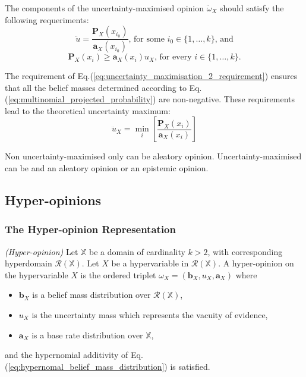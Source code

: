 The components of the uncertainty-maximised opinion $\ddot{\omega}_X$ should satisfy the following requeriments:
\begin{equation}
    \ddot{u} = \dfrac{\mathbf{P}_X(x_{i_0})}{\mathbf{a}_X(x_{i_0})}\text{, for some }i_0 \in \{1, \ldots, k\}\text{, and}
\end{equation}
\begin{equation}\label{eq:uncertainty_maximisation_2_requirement}
    \mathbf{P}_X(x_i) \geq \mathbf{a}_X(x_i)u_X\text{, for every }i \in \{1, \dots, k\}\text{.}
\end{equation}

The requirement of Eq.(\ref{eq:uncertainty_maximisation_2_requirement}) ensures that all the belief masses determined according to Eq.(\ref{eq:multinomial_projected_probability}) are non-negative. These requirements lead to the theoretical uncertainty maximum:
\begin{equation}
    \ddot{u}_X = \min\limits_i \left[\dfrac{\mathbf{P}_X(x_i)}{\mathbf{a}_X(x_i)}\right]
\end{equation}

Non uncertainty-maximised only can be aleatory opinion. Uncertainty-maximised can be and an aleatory opinion or an epistemic opinion.

\subsection{Hyper-opinions}

\subsubsection{The Hyper-opinion Representation}

\begin{definition}
    \emph{(Hyper-opinion)} Let $\mathbb{X}$ be a domain of cardinality $k > 2$, with corresponding hyperdomain $\mathcal{R}(\mathbb{X})$. Let $X$ be a hypervariable in $\mathcal{R}(\mathbb{X})$. A hyper-opinion on the hypervariable $X$ is the ordered triplet $\omega_X =(\mathbf{b}_X, u_X , \mathbf{a}_X)$ where
    \begin{itemize}
        \item $\mathbf{b}_X$ is a belief mass distribution over $\mathcal{R}(\mathbb{X})$,
        \item $u_X$ is the uncertainty mass which represents the vacuity of evidence,
        \item $\mathbf{a}_X$ is a base rate distribution over $\mathbb{X}$,
    \end{itemize}
    and the hypernomial additivity of Eq.(\ref{eq:hypernomal_belief_mass_distribution}) is satisfied.
\end{definition}

